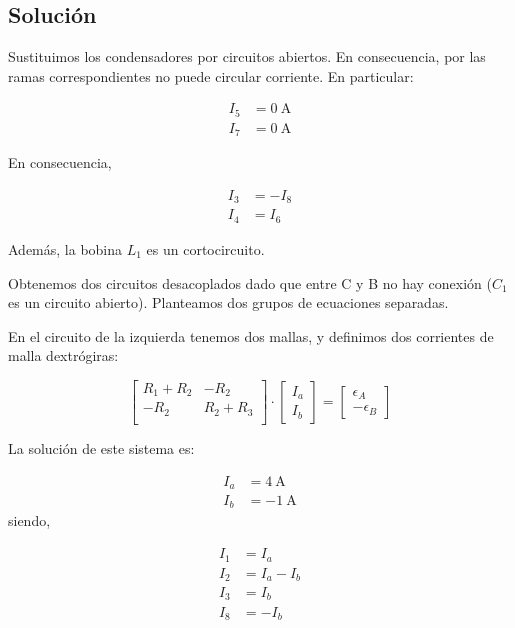 \documentclass[10pt]{article}
\begin{document}
\subsection*{Solución}

Sustituimos los condensadores por circuitos abiertos. En consecuencia, por las ramas correspondientes no puede circular corriente. En particular:

\begin{align*}
  I_5 &= \SI{0}{\ampere}\\
  I_7 &= \SI{0}{\ampere}
\end{align*}

En consecuencia,

\begin{align*}
  I_3 &= -I_8\\
  I_4 &= I_6
\end{align*}

Además, la bobina $L_1$ es un cortocircuito.

Obtenemos dos circuitos desacoplados dado que entre C y B no hay conexión ($C_1$ es un circuito abierto). Planteamos dos grupos de ecuaciones separadas.

En el circuito de la izquierda tenemos dos mallas, y definimos dos corrientes de malla dextrógiras:

\begin{equation*}
  \begin{bmatrix}
    R_1 + R_2 & -R_2\\
    -R_2 & R_2 + R_3\\
  \end{bmatrix} \cdot %
  \begin{bmatrix}
    I_a\\
    I_b
  \end{bmatrix} = %
  \begin{bmatrix}
    \epsilon_A\\
    -\epsilon_B
  \end{bmatrix}
\end{equation*}

La solución de este sistema es:

\begin{align*}
  I_a &= \SI{4}{\ampere}\\
  I_b &= \SI{-1}{\ampere}
\end{align*}
siendo,

\begin{align*}
  I_1 &= I_a\\
  I_2 &= I_a - I_b\\
  I_3 &= I_b\\
  I_8 &= -I_b
\end{align*}
\end{document}
